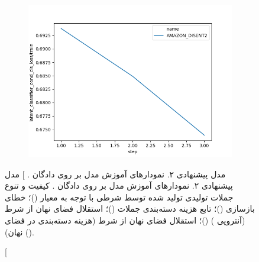 \begin{figure}[h]
\begin{subfigure}{0.3\textheight}
		\includegraphics[width=1.\textwidth]{images/figs2/2020_01_15__11_44_04__latent_classifier_cond_cls_loss.png}
		\caption{}
		\label{fig:chap4:amazon_disent_latent_cls}
	\end{subfigure}
	\caption
    [
    		مدل پیشنهادی ۲. نمودار‌های آموزش مدل بر روی دادگان \amazon{}.
    ]
    {
		مدل پیشنهادی ۲. نمودار‌های آموزش مدل بر روی دادگان \amazon{}.
		کیفیت و تنوع جملات تولیدی تولید شده توسط \decoder{} شرطی با توجه به معیار \jaccard{}
		()؛
		خطای بازسازی
		()؛
		تابع هزینه دسته‌بندی جملات
		()؛
		استقلال فضای نهان از شرط (آنتروپی \classifier{})
		()؛
		استقلال فضای نهان از شرط (هزینه دسته‌بندی \classifier{} در فضای نهان)
		().
	}
	\label{fig:chap4:amazon_disent}
\end{figure}
